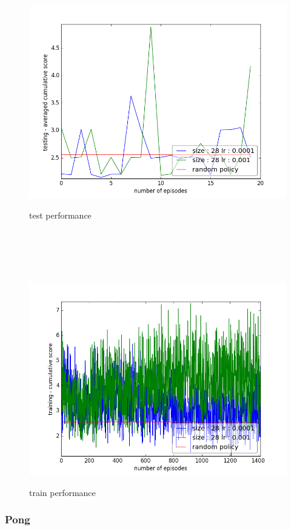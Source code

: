 \documentclass{report}
\begin{document}
\begin{figure}[H]
\begin{minipage}[c]{.49\linewidth}
	\centering
	\includegraphics[width = \linewidth]{plots/b3/MsPacman-v3/testScoreMean.png}
	\caption{test performance}
    \end{minipage}
    \hfill%
\begin{minipage}[c]{.49\linewidth}
    \centering 
    \includegraphics[width = \linewidth]{plots/b3/MsPacman-v3/trainScore.png}
	\caption{train performance}
\end{minipage}
\end{figure}

\subsubsection*{Pong}
\end{document}

